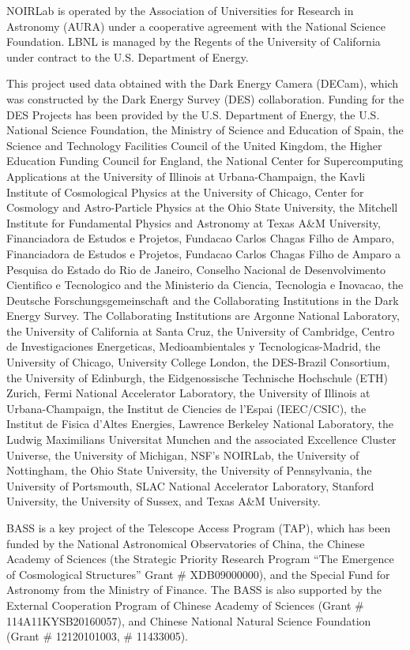 \documentclass[modern,linenumbers]{aastex702}
\begin{document}
\begin{acknowledgements}
NOIRLab is operated by the Association of Universities for Research in
Astronomy (AURA) under a cooperative agreement with the National
Science Foundation. LBNL is managed by the Regents of the University
of California under contract to the U.S. Department of Energy.

This project used data obtained with the Dark Energy Camera (DECam),
which was constructed by the Dark Energy Survey (DES)
collaboration. Funding for the DES Projects has been provided by the
U.S. Department of Energy, the U.S. National Science Foundation, the
Ministry of Science and Education of Spain, the Science and Technology
Facilities Council of the United Kingdom, the Higher Education Funding
Council for England, the National Center for Supercomputing
Applications at the University of Illinois at Urbana-Champaign, the
Kavli Institute of Cosmological Physics at the University of Chicago,
Center for Cosmology and Astro-Particle Physics at the Ohio State
University, the Mitchell Institute for Fundamental Physics and
Astronomy at Texas A\&M University, Financiadora de Estudos e
Projetos, Fundacao Carlos Chagas Filho de Amparo, Financiadora de
Estudos e Projetos, Fundacao Carlos Chagas Filho de Amparo a Pesquisa
do Estado do Rio de Janeiro, Conselho Nacional de Desenvolvimento
Cientifico e Tecnologico and the Ministerio da Ciencia, Tecnologia e
Inovacao, the Deutsche Forschungsgemeinschaft and the Collaborating
Institutions in the Dark Energy Survey. The Collaborating Institutions
are Argonne National Laboratory, the University of California at Santa
Cruz, the University of Cambridge, Centro de Investigaciones
Energeticas, Medioambientales y Tecnologicas-Madrid, the University of
Chicago, University College London, the DES-Brazil Consortium, the
University of Edinburgh, the Eidgenossische Technische Hochschule
(ETH) Zurich, Fermi National Accelerator Laboratory, the University of
Illinois at Urbana-Champaign, the Institut de Ciencies de l’Espai
(IEEC/CSIC), the Institut de Fisica d’Altes Energies, Lawrence
Berkeley National Laboratory, the Ludwig Maximilians Universitat
Munchen and the associated Excellence Cluster Universe, the University
of Michigan, NSF’s NOIRLab, the University of Nottingham, the Ohio
State University, the University of Pennsylvania, the University of
Portsmouth, SLAC National Accelerator Laboratory, Stanford University,
the University of Sussex, and Texas A\&M University.

BASS is a key project of the Telescope Access Program (TAP), which has
been funded by the National Astronomical Observatories of China, the
Chinese Academy of Sciences (the Strategic Priority Research Program
“The Emergence of Cosmological Structures” Grant \# XDB09000000), and
the Special Fund for Astronomy from the Ministry of Finance. The BASS
is also supported by the External Cooperation Program of Chinese
Academy of Sciences (Grant \# 114A11KYSB20160057), and Chinese National
Natural Science Foundation (Grant \# 12120101003, \# 11433005).


\end{acknowledgements}
\end{document}
